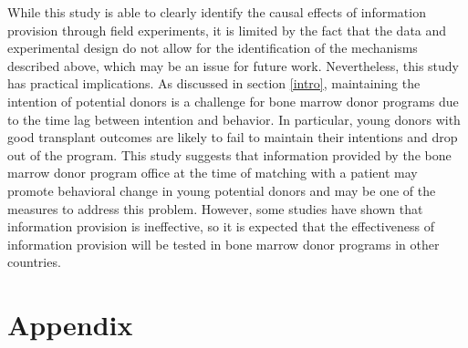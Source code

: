 \documentclass[
]{article}
\begin{document}
While this study is able to clearly identify the causal effects of information provision through field experiments, it is limited by the fact that the data and experimental design do not allow for the identification of the mechanisms described above, which may be an issue for future work. Nevertheless, this study has practical implications. As discussed in section \ref{intro}, maintaining the intention of potential donors is a challenge for bone marrow donor programs due to the time lag between intention and behavior. In particular, young donors with good transplant outcomes are likely to fail to maintain their intentions and drop out of the program. This study suggests that information provided by the bone marrow donor program office at the time of matching with a patient may promote behavioral change in young potential donors and may be one of the measures to address this problem. However, some studies \citep[e.g.][]{Switzer2018} have shown that information provision is ineffective, so it is expected that the effectiveness of information provision will be tested in bone marrow donor programs in other countries.

\clearpage

\hypertarget{appendix}{%
\section*{Appendix}\label{appendix}}
\end{document}
